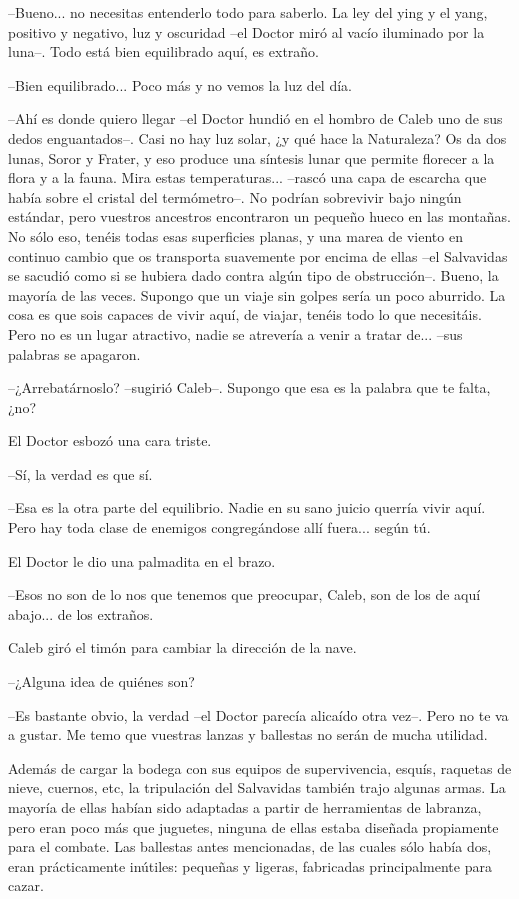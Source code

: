 --Bueno... no necesitas entenderlo todo para saberlo. La ley del ying y el yang, positivo y negativo, luz y oscuridad --el Doctor miró al vacío iluminado por la luna--. Todo está bien equilibrado aquí, es extraño.
 
--Bien equilibrado... Poco más y no vemos la luz del día.
 
--Ahí es donde quiero llegar --el Doctor hundió en el hombro de Caleb uno de sus dedos enguantados--. Casi no hay luz solar, ¿y qué hace la Naturaleza? Os da dos lunas, Soror y Frater, y eso produce una síntesis lunar que permite florecer a la flora y a la fauna. Mira estas temperaturas... --rascó una capa de escarcha que había sobre el cristal del termómetro--. No podrían sobrevivir bajo ningún estándar, pero vuestros ancestros encontraron un pequeño hueco en las montañas. No sólo eso, tenéis todas esas superficies planas, y una marea de viento en continuo cambio que os transporta suavemente por encima de ellas --el Salvavidas se sacudió como si se hubiera dado contra algún tipo de obstrucción--. Bueno, la mayoría de las veces. Supongo que un viaje sin golpes sería un poco aburrido. La cosa es que sois capaces de vivir aquí, de viajar, tenéis todo lo que necesitáis. Pero no es un lugar atractivo, nadie se atrevería a venir a tratar de... --sus palabras se apagaron.
 
--¿Arrebatárnoslo? --sugirió Caleb--. Supongo que esa es la palabra que te falta, ¿no?
 
El Doctor esbozó una cara triste.
 
--Sí, la verdad es que sí.
 
--Esa es la otra parte del equilibrio. Nadie en su sano juicio querría vivir aquí. Pero hay toda clase de enemigos congregándose allí fuera... según tú.
 
El Doctor le dio una palmadita en el brazo.
 
--Esos no son de lo nos que tenemos que preocupar, Caleb, son de los de aquí abajo... de los extraños.
 
Caleb giró el timón para cambiar la dirección de la nave.
 
--¿Alguna idea de quiénes son?
 
--Es bastante obvio, la verdad --el Doctor parecía alicaído otra vez--. Pero no te va a gustar. Me temo que vuestras lanzas y ballestas no serán de mucha utilidad.
 
Además de cargar la bodega con sus equipos de supervivencia, esquís, raquetas de nieve, cuernos, etc, la tripulación del Salvavidas también trajo algunas armas. La mayoría de ellas habían sido adaptadas a partir de herramientas de labranza, pero eran poco más que juguetes, ninguna de ellas estaba diseñada propiamente para el combate. Las ballestas antes mencionadas, de las cuales sólo había dos, eran prácticamente inútiles: pequeñas y ligeras, fabricadas principalmente para cazar.
 
